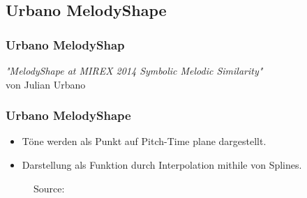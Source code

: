 \documentclass{beamer}
\begin{document}
	
	\subsection{Urbano MelodyShape}
		\begin{frame}
			\frametitle{Urbano MelodyShap}
			\begin{minipage}{0.45\textwidth}
				\begin{center}
					\textit{"MelodyShape at MIREX 2014 Symbolic Melodic Similarity"} 
					\cite{five_point_two}\\ 
					von Julian Urbano
				\end{center}
			\end{minipage}%
			\begin{minipage}{0.45\textwidth}
				\begin{figure}[h!]
				\end{figure}
			\end{minipage}
		\end{frame}
		
	\begin{frame}
        \frametitle{Urbano MelodyShape}
        \begin{minipage}{0.45\textwidth}
            \begin{itemize}
             \item Töne werden als Punkt  auf Pitch-Time plane dargestellt.
             \item Darstellung als Funktion durch Interpolation mithile von Splines.
            \end{itemize}
        \end{minipage}
        \begin{minipage}{0.45\textwidth}
        \begin{figure}[h!]
             \caption{Source: \cite{five_point_two}}
        \end{figure}
        \end{minipage}
	\end{frame}
	
\end{document}
